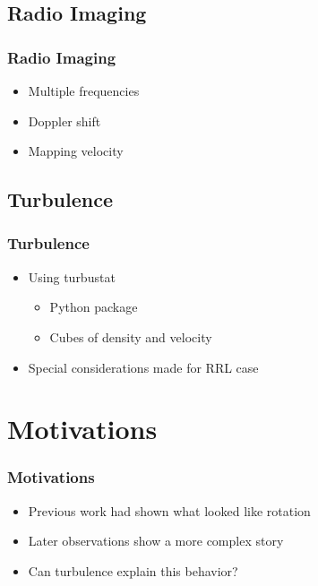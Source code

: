 \documentclass[aspectratio=169,compress]{beamer}
\begin{document}
\subsection{Radio Imaging}
\begin{frame}
  \frametitle{Radio Imaging}
  \begin{itemize}
    \item Multiple frequencies
    \item Doppler shift
    \item Mapping velocity
  \end{itemize}
\end{frame}

\subsection{Turbulence}
\begin{frame}
  \frametitle{Turbulence}
  \begin{itemize}
    \item Using turbustat
      \begin{itemize}
        \item Python package
        \item Cubes of density and velocity
      \end{itemize}
    \item Special considerations made for RRL case
  \end{itemize}
\end{frame}

\section{Motivations}
\begin{frame}
  \frametitle{Motivations}
  \begin{itemize}
    \item Previous work had shown what looked like rotation
    \item Later observations show a more complex story
    \item Can turbulence explain this behavior?
  \end{itemize}
\end{frame}
\end{document}
